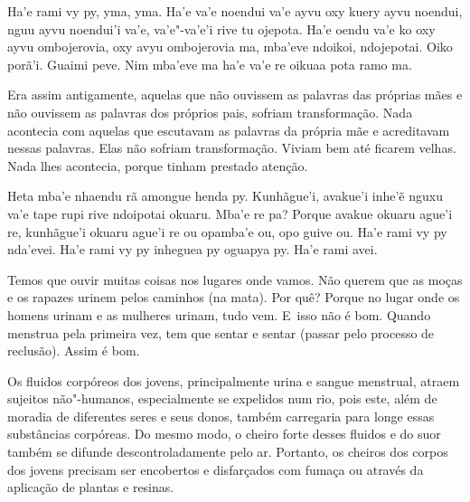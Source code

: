\begin{paracol}{2}
\footnotesize
\vspace*{0.4cm}

\noindent
Ha’e rami vy py, yma, yma. Ha’e va’e noendui va’e ayvu oxy kuery ayvu
noendui, nguu ayvu noendui’i va’e, va’e"-va’e’i rive tu ojepota. Ha’e
oendu va’e ko oxy ayvu ombojerovia, oxy avyu ombojerovia ma, mba’eve
ndoikoi, ndojepotai. Oiko porã’i. Guaimi peve. Nim mba’eve ma ha’e va’e
re oikuaa pota ramo ma. 

\bigskip

\switchcolumn
\noindent
Era assim antigamente, aquelas que não ouvissem as palavras das próprias
mães e não ouvissem as palavras dos próprios pais, sofriam
transformação. Nada acontecia com aquelas que escutavam as palavras da
própria mãe e acreditavam nessas palavras. Elas não sofriam
transformação. Viviam bem até ficarem velhas. Nada lhes acontecia,
porque tinham prestado atenção. 

\smallskip

\switchcolumn
\medskip
\noindent
Heta mba'e nhaendu rã amongue henda py. Kunhãgue'i, avakue'i inhe'ẽ
nguxu va'e tape rupi rive ndoipotai okuaru. Mba'e re pa? Porque avakue
okuaru ague'i re, kunhãgue'i okuaru ague'i re ou opamba'e ou, opo guive
ou. Ha'e rami vy py nda'evei. Ha'e rami vy py inheguea py oguapya py.
Ha'e rami avei.

\bigskip

\switchcolumn
\noindent
Temos que ouvir muitas coisas nos lugares onde vamos. Não querem que as
moças e os rapazes urinem pelos caminhos (na mata). Por quê? Porque no
lugar onde os homens urinam e as mulheres urinam, tudo
vem\footnotemark[11]. E~isso não é bom. Quando menstrua pela primeira
vez, tem que sentar e sentar (passar pelo processo de reclusão). Assim
é bom.
\end{paracol}

\bigskip

Os fluidos corpóreos dos jovens, principalmente urina e sangue
menstrual, atraem sujeitos não"-humanos, especialmente se expelidos num
rio, pois este, além de moradia de diferentes seres e seus donos,
também carregaria para longe essas substâncias corpóreas. Do mesmo
modo, o cheiro forte desses fluidos e do suor também se difunde
descontroladamente pelo ar. Portanto, os cheiros dos corpos dos jovens
precisam ser encobertos e disfarçados com fumaça ou através da
aplicação de plantas e resinas. 

